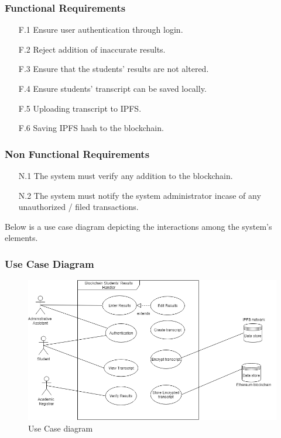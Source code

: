 \subsubsection{Functional Requirements}
\begin{enumerate}
\item[F.1] Ensure user authentication through login.
\item[F.2] Reject addition of inaccurate results.
\item[F.3] Ensure that the students’ results are not altered.
\item[F.4] Ensure students' transcript can be saved locally.
\item[F.5] Uploading transcript to IPFS.
\item[F.6] Saving IPFS hash to the blockchain.
\end{enumerate}

\subsubsection{Non Functional Requirements}
\begin{enumerate}
\item[N.1] The system must verify any addition to the blockchain.
\item[N.2] The system must notify the system administrator incase of any unauthorized / filed transactions.
\end{enumerate}

Below is a use case diagram depicting the interactions among the system's elements.
\subsubsection{Use Case Diagram}
\begin{figure}[H]
\includegraphics[scale=0.5]{images/UseCaseDiagram.png}
\caption{Use Case diagram}
\end{figure}


